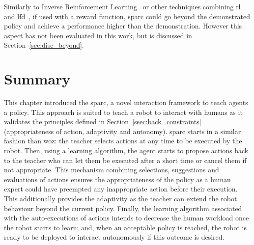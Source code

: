 Similarly to Inverse Reinforcement Learning~\citep{abbeel2004apprenticeship} or other techniques combining \gls{rl} and \gls{lfd}~\citep{billard2008robot}, if used with a reward function, \gls{sparc} could go beyond the demonstrated policy and achieve a performance higher than the demonstration. However this aspect has not been evaluated in this work, but is discussed in Section~\ref{sec:disc_beyond}.

\section{Summary}

This chapter introduced the \acrfull{sparc}, a novel interaction framework to teach agents a policy. This approach is suited to teach a robot to interact with humans as it validates the principles defined in Section~\ref{ssec:back_constraints} (appropriateness of action, adaptivity and autonomy). \gls{sparc} starts in a similar fashion than \gls{woz}: the teacher selects actions at any time to be executed by the robot. Then, using a learning algorithm, the agent starts to propose actions back to the teacher who can let them be executed after a short time or cancel them if not appropriate. This mechanism combining selections, suggestions and evaluations of actions ensures the appropriateness of the policy as a human expert could have preempted any inappropriate action before their execution. This additionally provides the adaptivity as the teacher can extend the robot behaviour beyond the current policy. Finally, the learning algorithm associated with the auto-executions of actions intends to decrease the human workload once the robot starts to learn; and, when an acceptable policy is reached, the robot is ready to be deployed to interact autonomously if this outcome is desired.
